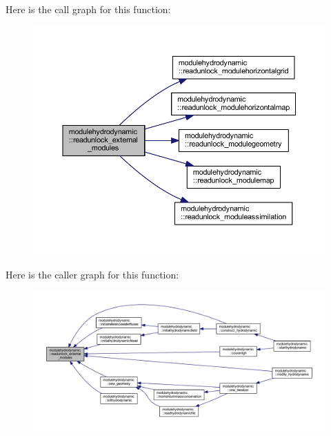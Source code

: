 Here is the call graph for this function\+:\nopagebreak
\begin{figure}[H]
\begin{center}
\leavevmode
\includegraphics[width=350pt]{namespacemodulehydrodynamic_a6bb278dc4ab8e6429e5d7e752bd6347a_cgraph}
\end{center}
\end{figure}
Here is the caller graph for this function\+:\nopagebreak
\begin{figure}[H]
\begin{center}
\leavevmode
\includegraphics[width=350pt]{namespacemodulehydrodynamic_a6bb278dc4ab8e6429e5d7e752bd6347a_icgraph}
\end{center}
\end{figure}
\mbox{\label{namespacemodulehydrodynamic_a758de1858d333cb26621ded54ff8be04}} 
